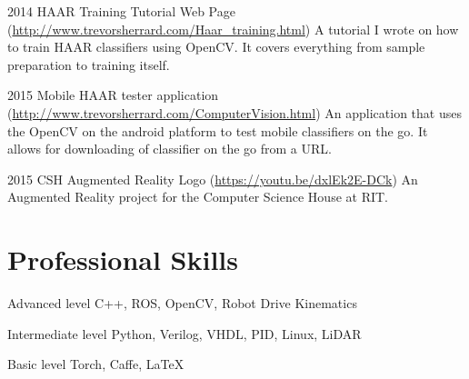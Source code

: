 \documentclass{tccv}
\begin{document}
\begin{yearlist}

\item{2014}
     {HAAR Training Tutorial Web Page (\href{http://www.trevorsherrard.com/Haar_training.html}{http://www.trevorsherrard.com\newline/Haar\_training.html})}
     {A tutorial I wrote on how to train HAAR classifiers using OpenCV. It covers everything from sample preparation to training itself.}
     
\item{2015}
     {Mobile HAAR tester application (\href{http://www.trevorsherrard.com/ComputerVision.html}{http://www.trevorsherrard.com\newline/ComputerVision.html})}
     {An application that uses the OpenCV on the android platform to test mobile classifiers on the go. It allows for downloading of classifier on the go from a URL.}
     
\item{2015}
     {CSH Augmented Reality Logo (\href{https://youtu.be/dxlEk2E-DCk}{https://youtu.be/dxlEk2E-DCk})}
     {An Augmented Reality project for the Computer Science House at RIT.}

\end{yearlist}


\section{Professional Skills}
\begin{factlist}

\item{Advanced  level}
     {C++, ROS, OpenCV, Robot Drive Kinematics}

\item{Intermediate level}
     {Python, Verilog, VHDL, PID, Linux, LiDAR}

\item{Basic level}
     {Torch, Caffe, \LaTeX}

\end{factlist}
\end{document}

